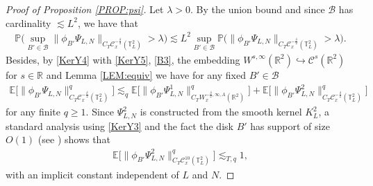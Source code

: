 \documentclass[letterpaper, 11pt,  reqno]{amsart}
\theoremstyle{myremark}
\newcommand{\1}{\hspace{0.5mm}\text{I}\hspace{0.5mm}}
\newcommand{\R}{\mathbb{R}}
\newcommand{\T}{\mathbb{T}}
\newcommand{\CC}{\mathcal{C}}
\newcommand{\E}{\mathbb{E}}
\newcommand{\dl}{\delta}
\newcommand{\ld}{\lambda}
\newcommand{\les}{\lesssim}
\numberwithin{equation}{section}
\numberwithin{theorem}{section}
\begin{document}
\begin{proof}[Proof of Proposition \ref{PROP:psi}]
Let $\ld >0$. By the union bound and since $\mathcal B$ has cardinality $\les L^2$, we have that
\begin{align}
\mathbb P \Big(\sup_{B' \in \mathcal B} \| \phi_{B'}\Psi_{L, N}\|_{C_T \CC_x^{-\frac \dl 2 }(\T_L^2)} > \ld \Big) \les L^2  \sup_{B' \in \mathcal B} \mathbb P \Big(\| \phi_{B'}\Psi_{L, N}\|_{C_T \CC_x^{-\frac \dl 2 }(\T_L^2)} > \ld \Big).
\label{pY4}
\end{align}
Besides, by \eqref{KerY4} with \eqref{KerY5}, \eqref{B3}, the embedding $W^{s,\infty}(\R^2) \hookrightarrow \CC^{s}(\R^2)$ for  $s \in \R$ and Lemma \ref{LEM:equiv} we have for any fixed $B' \in \mathcal B$
\begin{align}
\E\Big[ \|\phi_{B'}\Psi_{L, N}\|_{C_T \CC_x^{-\frac \dl 2 }(\T_L^2)}^q\Big] \les_q \E\Big[ \|\phi_{B'}\Psi^1_{L, N}\|_{C_T W^{-\frac \dl 2,\infty,A}_x(\R^2)}^q\Big]  + \E\Big[ \|\phi_{B'}\Psi^2_{L, N}\|_{C_T \CC_x^{-\frac \dl 2 }(\T_L^2)}^q\Big]
\label{pY5}
\end{align}
for any finite $q \ge 1$. Since $\Psi^2_{L,N}$ is constructed from the smooth kernel $K^2_L$, a standard analysis using \eqref{KerY3} and the fact the disk $B'$ has support of size $O(1)$ (see \cite{DPD, HS, MW2}) shows that
\begin{align}
\E\Big[ \|\phi_{B'}\Psi^2_{L, N}\|_{C_T \CC_x^{10}(\T_L^2)}^q\Big] \les_{T,q} 1,
\label{pY6}
\end{align}
with an implicit constant independent of $L$ and $N$.


\end{proof}
\end{document}
